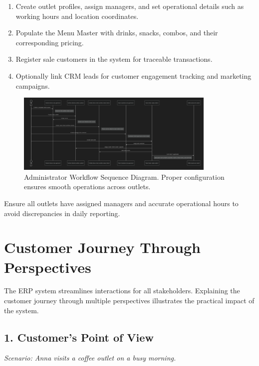 \begin{enumerate}
    \item Create outlet profiles, assign managers, and set operational details such as working hours and location coordinates.  
    \item Populate the Menu Master with drinks, snacks, combos, and their corresponding pricing.  
    \item Register sale customers in the system for traceable transactions.  
    \item Optionally link CRM leads for customer engagement tracking and marketing campaigns.  
\end{enumerate}

\begin{figure}[H]
    \centering
    \includegraphics[width=0.85\textwidth]{diagrams/sequence.png}
    \caption{Administrator Workflow Sequence Diagram. Proper configuration ensures smooth operations across outlets.}
    \label{fig:admin_workflow}
\end{figure}

\begin{tcolorbox}[colback=white,colframe=odooPurple,title=Tip, fonttitle=\bfseries, coltitle=white]
Ensure all outlets have assigned managers and accurate operational hours to avoid discrepancies in daily reporting.
\end{tcolorbox}

\section*{Customer Journey Through Perspectives}
The ERP system streamlines interactions for all stakeholders. Explaining the customer journey through multiple perspectives illustrates the practical impact of the system.

\subsection*{1. Customer's Point of View}
\textit{Scenario: Anna visits a coffee outlet on a busy morning.}

